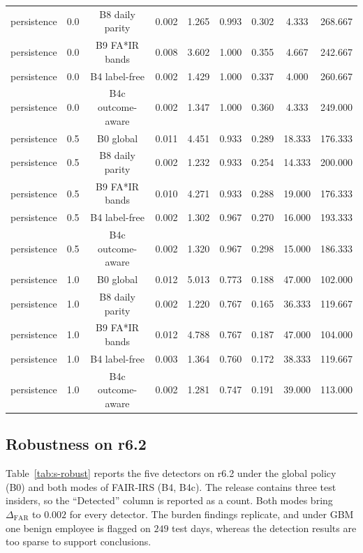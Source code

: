 \documentclass[10pt,onecolumn,letterpaper]{article}
\newcommand{\FAR}{\mathrm{FAR}}
\begin{document}
\begin{table}[!t]
{\begin{tabular}{lcccccccc}
persistence & 0.0 & B8 daily parity & 0.002 & 1.265 & 0.993 & 0.302 & 4.333 & 268.667 \\
persistence & 0.0 & B9 FA*IR bands & 0.008 & 3.602 & 1.000 & 0.355 & 4.667 & 242.667 \\
persistence & 0.0 & B4 label-free & 0.002 & 1.429 & 1.000 & 0.337 & 4.000 & 260.667 \\
persistence & 0.0 & B4c outcome-aware & 0.002 & 1.347 & 1.000 & 0.360 & 4.333 & 249.000 \\
persistence & 0.5 & B0 global & 0.011 & 4.451 & 0.933 & 0.289 & 18.333 & 176.333 \\
persistence & 0.5 & B8 daily parity & 0.002 & 1.232 & 0.933 & 0.254 & 14.333 & 200.000 \\
persistence & 0.5 & B9 FA*IR bands & 0.010 & 4.271 & 0.933 & 0.288 & 19.000 & 176.333 \\
persistence & 0.5 & B4 label-free & 0.002 & 1.302 & 0.967 & 0.270 & 16.000 & 193.333 \\
persistence & 0.5 & B4c outcome-aware & 0.002 & 1.320 & 0.967 & 0.298 & 15.000 & 186.333 \\
persistence & 1.0 & B0 global & 0.012 & 5.013 & 0.773 & 0.188 & 47.000 & 102.000 \\
persistence & 1.0 & B8 daily parity & 0.002 & 1.220 & 0.767 & 0.165 & 36.333 & 119.667 \\
persistence & 1.0 & B9 FA*IR bands & 0.012 & 4.788 & 0.767 & 0.187 & 47.000 & 104.000 \\
persistence & 1.0 & B4 label-free & 0.003 & 1.364 & 0.760 & 0.172 & 38.333 & 119.667 \\
persistence & 1.0 & B4c outcome-aware & 0.002 & 1.281 & 0.747 & 0.191 & 39.000 & 113.000 \\
\bottomrule
\end{tabular}}
\end{table}

\subsection{Robustness on r6.2}
Table~\ref{tab:s-robust} reports the five detectors on r6.2 under the global policy (B0) and both modes of FAIR-IRS (B4, B4c). The release contains three test insiders, so the ``Detected'' column is reported as a count. Both modes bring $\Delta_{\FAR}$ to $0.002$ for every detector. The burden findings replicate, and under GBM one benign employee is flagged on $249$ test days, whereas the detection results are too sparse to support conclusions.
\end{document}
